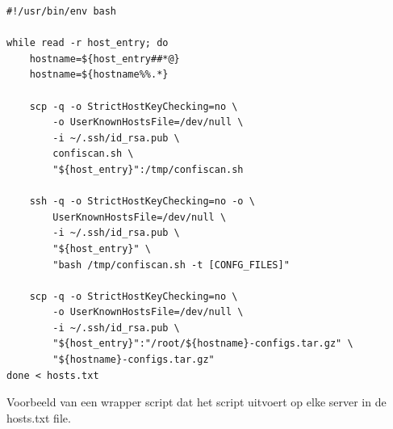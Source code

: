 \begin{listing}
  \begin{verbatim}
#!/usr/bin/env bash

while read -r host_entry; do
    hostname=${host_entry##*@}
    hostname=${hostname%%.*}

    scp -q -o StrictHostKeyChecking=no \
        -o UserKnownHostsFile=/dev/null \
        -i ~/.ssh/id_rsa.pub \
        confiscan.sh \
        "${host_entry}":/tmp/confiscan.sh

    ssh -q -o StrictHostKeyChecking=no -o \
        UserKnownHostsFile=/dev/null \
        -i ~/.ssh/id_rsa.pub \
        "${host_entry}" \
        "bash /tmp/confiscan.sh -t [CONFG_FILES]"

    scp -q -o StrictHostKeyChecking=no \
        -o UserKnownHostsFile=/dev/null \
        -i ~/.ssh/id_rsa.pub \
        "${host_entry}":"/root/${hostname}-configs.tar.gz" \
        "${hostname}-configs.tar.gz"
done < hosts.txt
  \end{verbatim}
  \caption[Wrapper script voor uitvoeren van script op servers.]{Voorbeeld van een wrapper script dat het script uitvoert op elke server in de hosts.txt file.}
  \label{lst:poc-wrapper-script}
\end{listing}
